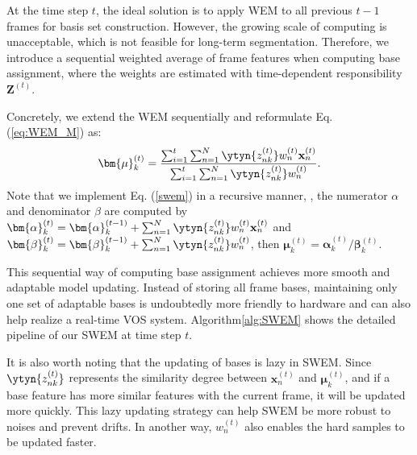 At the time step $t$, the ideal solution is to apply WEM to all previous $t-1$ frames for basis set construction.  
However, the growing scale of computing is unacceptable, which is not feasible for long-term segmentation. Therefore, we introduce a sequential weighted average of frame features when computing base assignment,  where the weights are estimated with time-dependent responsibility $\mathbf{Z}^{(t)}$.   

Concretely, we extend the WEM sequentially and reformulate Eq. (\ref{eq:WEM_M}) as:
\begin{equation}
    \bm{\mu}^{(t)}_k = \frac{\sum_{i=1}^{t}\sum_{n=1}^{N}\ytyn{{z}^{(t)}_{nk}}w^{(t)}_n\mathbf{x}^{(t)}_n}{\sum_{i=1}^{t}\sum_{n=1}^{N}\ytyn{{z}^{(t)}_{nk}}w^{(t)}_n}.
\label{swem}
\end{equation}
Note that we implement Eq. (\ref{swem}) in a recursive manner, \ie, the numerator $\alpha$ and denominator $\beta$ are computed by $\bm{\alpha}^{(t)}_k = \bm{\alpha}^{(t-1)}_k + \sum_{n=1}^{N}\ytyn{{z}^{(t)}_{nk}}w^{(t)}_n\mathbf{x}^{(t)}_n$ and $\bm{\beta}^{(t)}_k = \bm{\beta}^{(t-1)}_k + \sum_{n=1}^{N}\ytyn{{z}^{(t)}_{nk}}w^{(t)}_n$, then $\bm{\mu}^{(t)}_k = \bm{\alpha}^{(t)}_k/\bm{\beta}^{(t)}_k$.

This sequential way of computing base assignment achieves more smooth and adaptable model updating. Instead of storing all frame bases, maintaining only one set of adaptable bases is undoubtedly more friendly to hardware and can also help realize a real-time VOS system. Algorithm\ref{alg:SWEM} shows the detailed pipeline of our SWEM at time step $t$.%

It is also worth noting that the updating of bases is lazy in SWEM.
Since $\ytyn{{z}^{(t)}_{nk}}$ represents the similarity degree between $\mathbf{x}^{(t)}_n$ and $\bm{\mu}^{(t)}_k$, and if a base feature has more similar features with the current frame, it will be updated more quickly. This lazy updating strategy can help SWEM be more robust to noises and prevent drifts. In another way, $w^{(t)}_n$ also enables the hard samples to be updated faster. 

